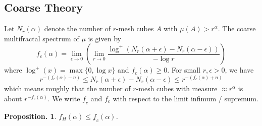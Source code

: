 \documentclass[11pt, a4paper]{memoir}
\theoremstyle{change}
\newtheorem{proposition}[theorem]{Proposition.}
\theoremstyle{plain}
\theoremstyle{nonumberplain}
\numberwithin{equation}{section}
\begin{document}
\subsection{Coarse Theory}
Let $N_r(\alpha)$ denote the number of $r$-mesh cubes $A$ with $\mu(A)>r^\alpha$.
The coarse multifractal spectrum of $\mu$ is given by
\begin{equation*}
    f_c(\alpha) = \lim_{\epsilon\to 0}\left(\lim_{r\to 0}\frac{\log^+(N_r(\alpha+\epsilon)-N_r(\alpha-\epsilon))}{-\log r}\right)
\end{equation*}
where $\log^+(x)=\max\{0,\log x\}$ and $f_c(\alpha)\geq 0$.
For small $r,\epsilon>0$, we have
\begin{equation*}
    r^{-(f_c(\alpha)-n)}\leq N_r(\alpha+\epsilon)-N_r(\alpha-\epsilon)\leq r^{-(f_c(\alpha)+n)}
\end{equation*}
which means roughly that the number of $r$-mesh cubes with measure $\approx r^\alpha$ is about $r^{-f_c(\alpha)}$.
We write $\underline{f}_c$ and $\overline{f}_c$ with respect to the limit infimum / supremum.
\begin{proposition}
    $f_H(\alpha)\leq\underline{f}_c(\alpha)$.
\end{proposition}
\end{document}
